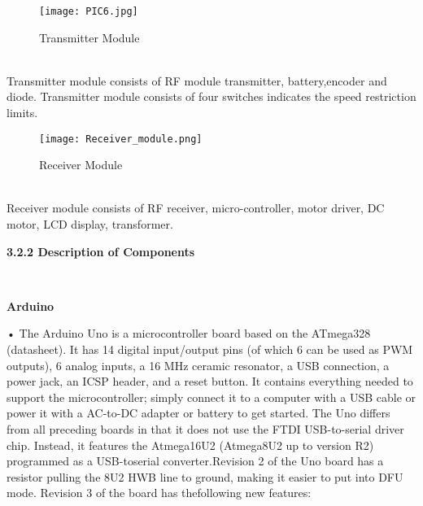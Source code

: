 \documentclass[a4paper,12pt, English]{article}
\begin{document}
\begin{normalsize}
\newpage
\begin{figure}[htb]
\begin{center}
\texttt{[image: PIC6.jpg]}
\end{center}
\begin{center}
\renewcommand{\thefigure}{3. 2. 2}
\caption{\footnotesize Transmitter Module }
\end{center}
\end{figure}\\
\tabIn Transmitter module consists of RF module transmitter, battery,encoder and diode.
\newline Transmitter module consists of four switches indicates the speed restriction limits.
\newpage
\begin{figure}[htb]
\begin{center}
\texttt{[image: Receiver\_module.png]}
\end{center}
\begin{center}
\renewcommand{\thefigure}{3. 2. 3}
\caption{\footnotesize Receiver Module }
\end{center}
\end{figure}\\
\tabIn Receiver module consists of RF receiver, micro-controller, motor driver, DC motor, LCD display, transformer.
\newpage
\begin{large}
\textbf{3.2.2 Description of Components}
\end{large}
\\
\begin{large}
\textbf{Arduino }
\end{large}
\newline
• The Arduino Uno is a microcontroller board based on the
ATmega328 (datasheet). It has 14 digital input/output pins (of which 6 can
be used as PWM outputs), 6 analog inputs, a 16 MHz ceramic resonator, a
USB connection, a power jack, an ICSP header, and a reset button. It
contains everything needed to support the microcontroller; simply connect
it to a computer with a USB cable or power it with a AC-to-DC adapter or
battery to get started. The Uno differs from all preceding boards in that it
does not use the FTDI USB-to-serial driver chip. Instead, it features the
Atmega16U2 (Atmega8U2 up to version R2) programmed as a USB-toserial converter.Revision 2 of the Uno board has a resistor pulling the 8U2
HWB line to ground, making it easier to put into DFU mode. Revision 3
of the board has thefollowing new features:
\newline

\end{normalsize}
\end{document}

